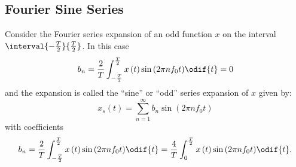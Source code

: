 \documentclass{article}
\begin{document}
\subsection{Fourier Sine Series}
Consider the Fourier series expansion of an odd function \(x\) on the
interval \(\interval{-\frac{T}{2}}{\frac{T}{2}}\). In this case
\begin{equation*}
    b_n = \frac{2}{T} \int_{-\frac{T}{2}}^{\frac{T}{2}} x\left( t \right) \sin{\left( 2\pi n f_0 t \right)} \odif{t} = 0
\end{equation*}
and the expansion is called the ``sine'' or ``odd'' series expansion of
\(x\) given by:
\begin{equation*}
    x_s\left( t \right) = \sum_{n = 1}^\infty b_n \sin{\left( 2\pi n f_0 t \right)}
\end{equation*}
with coefficients
\begin{equation*}
    b_n = \frac{2}{T} \int_{-\frac{T}{2}}^{\frac{T}{2}} x\left( t \right) \sin{\left( 2 \pi n f_0 t \right)} \odif{t} = \frac{4}{T} \int_0^{\frac{T}{2}} x\left( t \right) \sin{\left( 2\pi n f_0 t \right)} \odif{t}.
\end{equation*}
\end{document}

